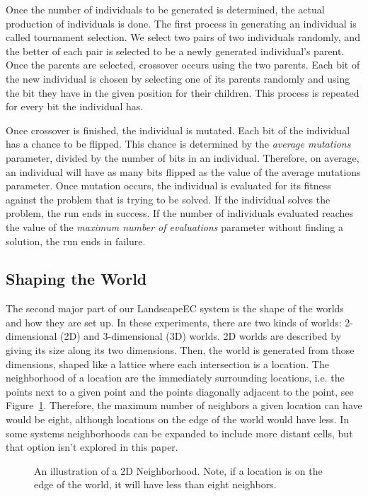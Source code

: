 \documentclass[12pt]{article}
\begin{document}
Once the number of individuals to be generated is determined, the actual production of individuals is done. The first process in generating an individual is called tournament selection. We select two pairs of two individuals randomly, and the better of each pair is selected to be a newly generated individual's parent. Once the parents are selected, crossover occurs using the two parents. Each bit of the new individual is chosen by selecting one of its parents randomly and using the bit they have in the given position for their children. This process is repeated for every bit the individual has.

Once crossover is finished, the individual is mutated. Each bit of the individual has a chance to be flipped. This chance is determined by the \emph{average mutations} parameter, divided by the number of bits in an individual. Therefore, on average, an individual will have as many bits flipped as the value of the average mutations parameter. Once mutation occurs, the individual is evaluated for its fitness against the problem that is trying to be solved. If the individual solves the problem, the run ends in success. If the number of individuals evaluated reaches the value of the \emph{maximum number of evaluations} parameter without finding a solution, the run ends in failure.

\subsection{Shaping the World}
\label{sec:shapingtheworld}
The second major part of our LandscapeEC system is the shape of the worlds and how they are set up. In these experiments, there are two kinds of worlds: 2-dimensional (2D) and 3-dimensional (3D) worlds. 2D worlds are described by giving its size along its two dimensions. Then, the world is generated from those dimensions, shaped like a lattice where each intersection is a location. The neighborhood of a location are the immediately surrounding locations, i.e. the points next to a given point and the points diagonally adjacent to the point, see Figure~\ref{fig:2DNeighborhood}. Therefore, the maximum number of neighbors a given location can have would be eight, although locations on the edge of the world would have less. In some systems neighborhoods can be expanded to include more distant cells, but that option isn't explored in this paper. 

\begin{figure}[tb]

 \centering
 \caption{An illustration of a 2D Neighborhood. Note, if a location is on the edge of the world, it will have less than eight neighbors.}
 \label{fig:2DNeighborhood}

\end{figure}
\end{document}
